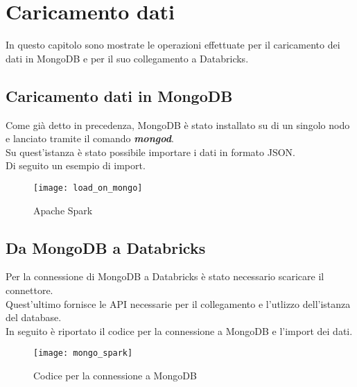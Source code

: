 
\chapter{Caricamento dati}
In questo capitolo sono mostrate le operazioni effettuate per il caricamento
dei dati in MongoDB e per il suo collegamento a Databricks.

\section{Caricamento dati in MongoDB}
Come già detto in precedenza, MongoDB è stato installato su di un singolo nodo
e lanciato tramite il comando \textbf{\textit{mongod}}.\\
Su quest'istanza è stato possibile importare i dati in formato JSON.\\
Di seguito un esempio di import.

\begin{figure}[!htbp]
	\texttt{[image: load\_on\_mongo]}
  \caption{Apache Spark}
  \label{}
\end{figure}
\clearpage

\section{Da MongoDB a Databricks}

Per la connessione di MongoDB a Databricks è stato necessario scaricare il connettore.\\
Quest'ultimo fornisce le API necessarie per il collegamento e l'utlizzo dell'istanza del database.\\
In seguito è riportato il codice per la connessione a MongoDB e l'import dei dati.

\begin{figure}[!htbp]
  \texttt{[image: mongo\_spark]}
  \caption{Codice per la connessione a MongoDB}
  \label{mongo_spark}
\end{figure}

